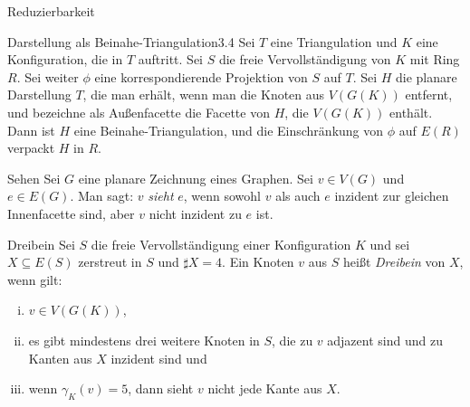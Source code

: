 \begin{section}{Reduzierbarkeit}
 \begin{satzl}{Darstellung als Beinahe-Triangulation}{3.4}
  Sei $T$ eine Triangulation und $K$ eine Konfiguration, die in $T$ auftritt. Sei $S$ die freie Vervollständigung von $K$ mit Ring $R$. Sei weiter $\phi$ eine korrespondierende Projektion von $S$ auf $T$. Sei $H$ die planare Darstellung $T$, die man erhält, wenn man die Knoten aus $V(G(K))$ entfernt, und bezeichne als Außenfacette die Facette von $H$, die $V(G(K))$ enthält. Dann ist $H$ eine Beinahe-Triangulation, und die Einschränkung von $\phi$ auf $E(R)$ verpackt $H$ in $R$.  
 \end{satzl}

 \begin{definition}{Sehen}
  Sei $G$ eine planare Zeichnung eines Graphen. Sei $v \in V(G)$ und $e \in E(G)$. Man sagt: $v$ \textit{sieht} $e$, wenn sowohl $v$ als auch $e$ inzident zur gleichen Innenfacette sind, aber $v$ nicht inzident zu $e$ ist.
 \end{definition}

 \begin{definition}{Dreibein}
  Sei $S$ die freie Vervollständigung einer Konfiguration $K$ und sei $X \subseteq E(S)$ zerstreut in $S$ und $\sharp X = 4$. Ein Knoten $v$ aus $S$ heißt \textit{Dreibein} von $X$, wenn gilt:
  \begin{enumerate}[(i)]
   \item $v \in V(G(K))$,
   \item es gibt mindestens drei weitere Knoten in $S$, die zu $v$ adjazent sind und zu Kanten aus $X$ inzident sind und
   \item wenn $\gamma_K(v) = 5$, dann sieht $v$ nicht jede Kante aus $X$.
  \end{enumerate}
 \end{definition}
 

\end{section}
